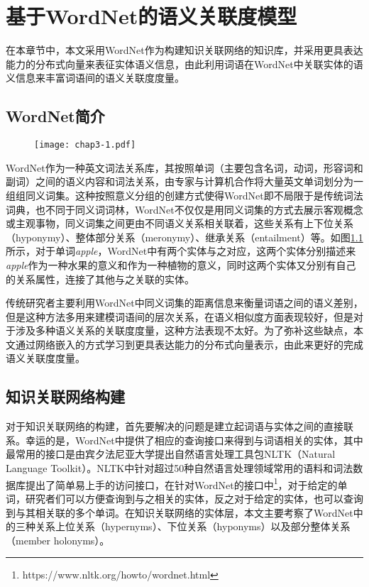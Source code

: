 \chapter{基于WordNet的语义关联度模型}
\label{chap:chap03}
在本章节中，本文采用WordNet作为构建知识关联网络的知识库，并采用更具表达能力的分布式向量来表征实体语义信息，由此利用词语在WordNet中关联实体的语义信息来丰富词语间的语义关联度度量。

\section{WordNet简介}
\begin{figure}[!ht]
    \centerline{\texttt{[image: chap3-1.pdf]}}
    \label{chap3-1}
\end{figure}

WordNet作为一种英文词法关系库，其按照单词（主要包含名词，动词，形容词和副词）之间的语义内容和词法关系，由专家与计算机合作将大量英文单词划分为一组组同义词集。这种按照意义分组的创建方式使得WordNet即不局限于是传统词法词典，也不同于同义词词林，WordNet不仅仅是用同义词集的方式去展示客观概念或主观事物，同义词集之间更由不同语义关系相关联着，这些关系有上下位关系（hyponymy）、整体部分关系（meronymy）、继承关系（entailment）等。如图\ref{chap3-1}所示，对于单词\emph{apple}，WordNet中有两个实体与之对应，这两个实体分别描述来\emph{apple}作为一种水果的意义和作为一种植物的意义，同时这两个实体又分别有自己的关系属性，连接了其他与之关联的实体。

传统研究者\cite{its/Rada89, Leacock98, wu1994verb, tkde/LiBM03}主要利用WordNet中同义词集的距离信息来衡量词语之间的语义差别，但是这种方法多用来建模词语间的层次关系，在语义相似度方面表现较好，但是对于涉及多种语义关系的关联度度量，这种方法表现不太好。为了弥补这些缺点，本文通过网络嵌入的方式学习到更具表达能力的分布式向量表示，由此来更好的完成语义关联度度量。

\section{知识关联网络构建}
对于知识关联网络的构建，首先要解决的问题是建立起词语与实体之间的直接联系。幸运的是，WordNet中提供了相应的查询接口来得到与词语相关的实体，其中最常用的接口是由宾夕法尼亚大学提出自然语言处理工具包NLTK（Natural Language Toolkit）\cite{OM/Bird09}。NLTK中针对超过50种自然语言处理领域常用的语料和词法数据库提出了简单易上手的访问接口，在针对WordNet的接口中\footnote{https://www.nltk.org/howto/wordnet.html}，对于给定的单词，研究者们可以方便查询到与之相关的实体，反之对于给定的实体，也可以查询到与其相关联的多个单词。在知识关联网络的实体层，本文主要考察了WordNet中的三种关系上位关系（hypernyms）、下位关系（hyponyms）以及部分整体关系（member holonyms）。

